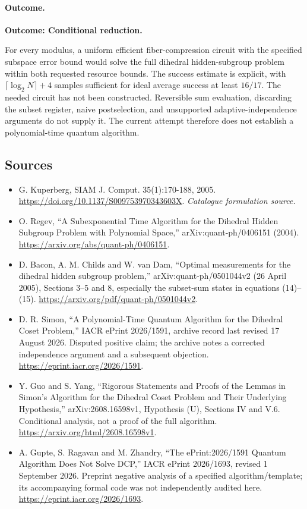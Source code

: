 \documentclass[11pt,a4paper]{article}
\begin{document}
\paragraph{Outcome.}
\textbf{Outcome: Conditional reduction.}

For every modulus, a uniform efficient fiber-compression circuit with the
specified subspace error bound would solve the full dihedral hidden-subgroup
problem within both requested resource bounds. The success estimate is
explicit, with $\lceil\log_2N\rceil+4$ samples sufficient for ideal average
success at least $16/17$. The needed circuit has not been constructed.
Reversible sum evaluation, discarding the subset register, naive
postselection, and unsupported adaptive-independence arguments do not
supply it. The current attempt therefore does not establish a
polynomial-time quantum algorithm.
\subsection{Sources}
\begin{itemize}\raggedright
\item[\textnormal{[S1]}]\hypertarget{source:statement:1}{} G. Kuperberg, SIAM J. Comput. 35(1):170-188, 2005.
\url{https://doi.org/10.1137/S009753970343603X}.
{\small\textit{Catalogue formulation source.}}
\item[\textnormal{[E1]}]\hypertarget{extra:statement:1}{} O. Regev, ``A Subexponential Time Algorithm for the Dihedral Hidden Subgroup Problem with Polynomial Space,'' arXiv:quant-ph/0406151 (2004).
\url{https://arxiv.org/abs/quant-ph/0406151}.
\item[\textnormal{[E2]}]\hypertarget{extra:statement:2}{} D. Bacon, A. M. Childs and W. van Dam, ``Optimal measurements for the dihedral hidden subgroup problem,'' arXiv:quant-ph/0501044v2 (26 April 2005), Sections 3--5 and 8, especially the subset-sum states in equations (14)--(15).
\url{https://arxiv.org/pdf/quant-ph/0501044v2}.
\item[\textnormal{[E3]}]\hypertarget{extra:statement:3}{} D. R. Simon, ``A Polynomial-Time Quantum Algorithm for the Dihedral Coset Problem,'' IACR ePrint 2026/1591, archive record last revised 17 August 2026. Disputed positive claim; the archive notes a corrected independence argument and a subsequent objection.
\url{https://eprint.iacr.org/2026/1591}.
\item[\textnormal{[E4]}]\hypertarget{extra:statement:4}{} Y. Guo and S. Yang, ``Rigorous Statements and Proofs of the Lemmas in Simon's Algorithm for the Dihedral Coset Problem and Their Underlying Hypothesis,'' arXiv:2608.16598v1, Hypothesis (U), Sections IV and V.6. Conditional analysis, not a proof of the full algorithm.
\url{https://arxiv.org/html/2608.16598v1}.
\item[\textnormal{[E5]}]\hypertarget{extra:statement:5}{} A. Gupte, S. Ragavan and M. Zhandry, ``The ePrint:2026/1591 Quantum Algorithm Does Not Solve DCP,'' IACR ePrint 2026/1693, revised 1 September 2026. Preprint negative analysis of a specified algorithm/template; its accompanying formal code was not independently audited here.
\url{https://eprint.iacr.org/2026/1693}.
\end{itemize}
\end{document}
